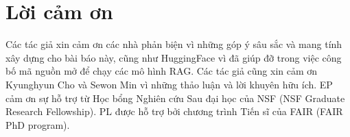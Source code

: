 \documentclass[10pt,letterpaper]{article}
\begin{document}
\section*{Lời cảm ơn}
Các tác giả xin cảm ơn các nhà phản biện vì những góp ý sâu sắc và mang tính
xây dựng cho bài báo này, cũng như HuggingFace vì đã giúp đỡ trong việc công bố
mã nguồn mở để chạy các mô hình RAG. Các tác giả cũng xin cảm ơn Kyunghyun Cho
và Sewon Min vì những thảo luận và lời khuyên hữu ích. EP cảm ơn sự hỗ trợ từ
Học bổng Nghiên cứu Sau đại học của NSF (NSF Graduate Research Fellowship). PL
được hỗ trợ bởi chương trình Tiến sĩ của FAIR (FAIR PhD program).

\end{document}
